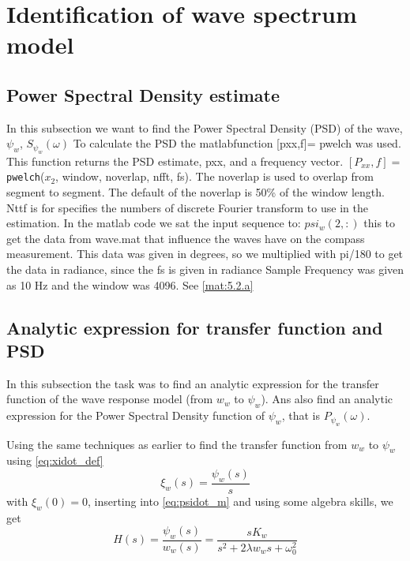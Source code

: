 
\section{Identification of wave spectrum model} \label{sec:part2}

\subsection{Power Spectral Density estimate}
In this subsection we want to find the Power Spectral Density (PSD) of the wave,$\psi_w$, $S_{\psi_w}(\omega)$
\bigskip
To calculate the PSD the matlabfunction [pxx,f]= pwelch was used. This function returns the PSD estimate, pxx, and a frequency vector.\bigskip 
 $[P_{xx} , f] = $\texttt{pwelch}($x_2$, window, noverlap, nfft, fs). 
 The noverlap is used to overlap from segment to segment. The default of the noverlap is 50\% of the window length. 
 Nttf is for specifies the numbers of discrete Fourier transform to use in the estimation. 
 In the matlab code we sat the input sequence to: $psi_w(2,:)$ this to get the data from wave.mat that influence the waves have on the compass measurement. This data was given in degrees, so we multiplied with pi/180 to get the data in radiance, since the fs is given in radiance
 Sample Frequency was given as 10 Hz and the window was 4096.
 See \cref{mat:5.2.a}
\newline


\subsection{Analytic expression for transfer function and PSD}
In this subsection the task was to find an analytic expression for the transfer function of the wave response model (from $w_w$ to $\psi_w$). Ans also find an analytic expression for the Power Spectral Density function of $\psi_w$, that is $P_{\psi_w}(\omega)$.

Using the same techniques as earlier to find the transfer function from $w_w$ to $\psi_w$ using \cref{eq:xidot_def} 
\begin{equation*}
    \xi_w(s) = \frac{\psi_w(s)}{s}
\end{equation*}
with $\xi_w(0) = 0$, inserting into \cref{eq:psidot_m} and using some algebra skills, we get
\begin{equation} 
    H(s) =  \frac{\psi_{w}(s)}{w_{w}(s)} = \frac{s K_w}{s^2 + 2\lambda w_w s + \omega_0^2}
\end{equation}
\bigskip

